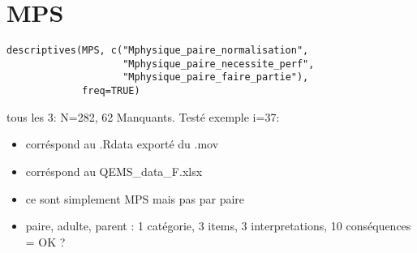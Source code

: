\documentclass[
]{article}
\begin{document}
\hypertarget{mps}{%
\section{MPS}\label{mps}}

\begin{verbatim}
descriptives(MPS, c("Mphysique_paire_normalisation", 
                    "Mphysique_paire_necessite_perf",
                    "Mphysique_paire_faire_partie"),
             freq=TRUE)
\end{verbatim}

tous les 3: N=282, 62 Manquants. Testé exemple i=37:

\begin{itemize}
\item
  corréspond au .Rdata exporté du .mov
\item
  corréspond au QEMS\_data\_F.xlsx
\item
  ce sont simplement MPS mais pas par paire
\item
  paire, adulte, parent : 1 catégorie, 3 items, 3 interpretations, 10
  conséquences = OK ?
\end{itemize}
\end{document}
